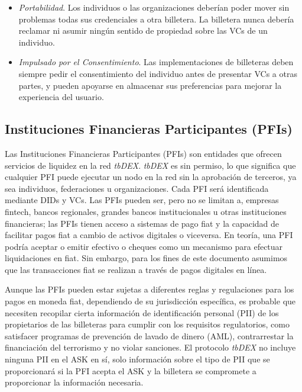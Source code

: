 \documentclass[11pt]{article}
\begin{document}
\begin{itemize}
	\item \textit{Portabilidad}. Los individuos o las organizaciones deberían poder mover sin problemas todas sus credenciales a otra billetera. La billetera nunca debería reclamar ni asumir ningún sentido de propiedad sobre las VCs de un individuo.

	\item \textit{Impulsado por el Consentimiento}. Las implementaciones de billeteras deben siempre pedir el consentimiento del individuo antes de presentar VCs a otras partes, y pueden apoyarse en almacenar sus preferencias para mejorar la experiencia del usuario.

\end{itemize}
\subsection{Instituciones Financieras Participantes (PFIs)}

\vspace{1\baselineskip}
Las Instituciones Financieras Participantes (PFIs) son entidades que ofrecen servicios de liquidez en la red \textit{tbDEX}. \textit{tbDEX} es sin permiso, lo que significa que cualquier PFI puede ejecutar un nodo en la red sin la aprobación de terceros, ya sea individuos, federaciones u organizaciones. Cada PFI será identificada mediante DIDs y VCs. Las PFIs pueden ser, pero no se limitan a, empresas fintech, bancos regionales, grandes bancos institucionales u otras instituciones financieras; las PFIs tienen acceso a sistemas de pago fiat y la capacidad de facilitar pagos fiat a cambio de activos digitales o viceversa. En teoría, una PFI podría aceptar o emitir efectivo o cheques como un mecanismo para efectuar liquidaciones en fiat. Sin embargo, para los fines de este documento asumimos que las transacciones fiat se realizan a través de pagos digitales en línea.

\vspace{1\baselineskip}
Aunque las PFIs pueden estar sujetas a diferentes reglas y regulaciones para los pagos en moneda fiat, dependiendo de su jurisdicción específica, es probable que necesiten recopilar cierta información de identificación personal (PII) de los propietarios de las billeteras para cumplir con los requisitos regulatorios, como satisfacer programas de prevención de lavado de dinero (AML), contrarrestar la financiación del terrorismo y no violar sanciones. El protocolo \textit{tbDEX} no incluye ninguna PII en el ASK en sí, solo información sobre el tipo de PII que se proporcionará si la PFI acepta el ASK y la billetera se compromete a proporcionar la información necesaria.
\end{document}
